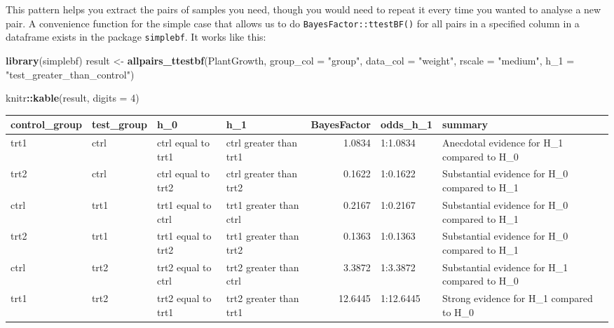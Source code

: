 \documentclass[
]{book}
\newenvironment{Shaded}{\begin{snugshade}}{\end{snugshade}}
\newcommand{\DataTypeTok}[1]{\textcolor[rgb]{0.13,0.29,0.53}{#1}}
\newcommand{\DecValTok}[1]{\textcolor[rgb]{0.00,0.00,0.81}{#1}}
\newcommand{\KeywordTok}[1]{\textcolor[rgb]{0.13,0.29,0.53}{\textbf{#1}}}
\newcommand{\NormalTok}[1]{#1}
\newcommand{\OperatorTok}[1]{\textcolor[rgb]{0.81,0.36,0.00}{\textbf{#1}}}
\newcommand{\StringTok}[1]{\textcolor[rgb]{0.31,0.60,0.02}{#1}}
\begin{document}
This pattern helps you extract the pairs of samples you need, though you would need to repeat it every time you wanted to analyse a new pair. A convenience function for the simple case that allows us to do \texttt{BayesFactor::ttestBF()} for all pairs in a specified column in a dataframe exists in the package \texttt{simplebf}. It works like this:

\begin{Shaded}
\begin{Highlighting}[]
\KeywordTok{library}\NormalTok{(simplebf)}
\NormalTok{result <-}\StringTok{ }\KeywordTok{allpairs_ttestbf}\NormalTok{(PlantGrowth, }
                           \DataTypeTok{group_col =} \StringTok{"group"}\NormalTok{, }\DataTypeTok{data_col =} \StringTok{"weight"}\NormalTok{, }
                           \DataTypeTok{rscale =} \StringTok{"medium"}\NormalTok{, }
                           \DataTypeTok{h_1 =} \StringTok{"test_greater_than_control"}\NormalTok{)}

\NormalTok{knitr}\OperatorTok{::}\KeywordTok{kable}\NormalTok{(result, }\DataTypeTok{digits =} \DecValTok{4}\NormalTok{)}
\end{Highlighting}
\end{Shaded}

\begin{tabular}{l|l|l|l|r|l|l}
\hline
control\_group & test\_group & h\_0 & h\_1 & BayesFactor & odds\_h\_1 & summary\\
\hline
trt1 & ctrl & ctrl equal to trt1 & ctrl greater than trt1 & 1.0834 & 1:1.0834 & Anecdotal evidence for H\_1 compared to H\_0\\
\hline
trt2 & ctrl & ctrl equal to trt2 & ctrl greater than trt2 & 0.1622 & 1:0.1622 & Substantial evidence for H\_0 compared to H\_1\\
\hline
ctrl & trt1 & trt1 equal to ctrl & trt1 greater than ctrl & 0.2167 & 1:0.2167 & Substantial evidence for H\_0 compared to H\_1\\
\hline
trt2 & trt1 & trt1 equal to trt2 & trt1 greater than trt2 & 0.1363 & 1:0.1363 & Substantial evidence for H\_0 compared to H\_1\\
\hline
ctrl & trt2 & trt2 equal to ctrl & trt2 greater than ctrl & 3.3872 & 1:3.3872 & Substantial evidence for H\_1 compared to H\_0\\
\hline
trt1 & trt2 & trt2 equal to trt1 & trt2 greater than trt1 & 12.6445 & 1:12.6445 & Strong evidence for H\_1 compared to H\_0\\
\hline
\end{tabular}
\end{document}
